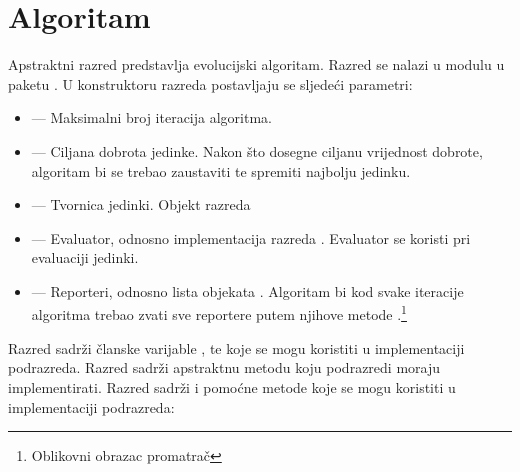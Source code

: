 \documentclass[times, utf8, zavrsni, numeric]{fer}
\begin{document}
\section{Algoritam}\label{algorithm}
Apstraktni razred  predstavlja evolucijski algoritam. Razred
se nalazi u modulu  u paketu . U
konstruktoru razreda  postavljaju se sljedeći parametri:
\begin{itemize}
    \item {} --- Maksimalni broj iteracija algoritma.
    \item {} --- Ciljana dobrota  jedinke.
        Nakon što dosegne ciljanu vrijednost dobrote, algoritam bi se trebao
        zaustaviti te spremiti najbolju jedinku.
    \item {} --- Tvornica jedinki. Objekt razreda
    \item {} --- Evaluator, odnosno implementacija razreda
        . Evaluator se koristi pri evaluaciji jedinki.
    \item {} --- Reporteri, odnosno lista objekata
        . Algoritam bi kod svake iteracije algoritma trebao
        zvati sve reportere putem njihove metode
        .\footnote{Oblikovni obrazac promatrač}
\end{itemize}
Razred sadrži članske varijable , 
te  koje se mogu koristiti u implementaciji podrazreda.
Razred sadrži apstraktnu metodu  koju podrazredi moraju
implementirati.
Razred  sadrži i pomoćne metode koje se mogu koristiti u
implementaciji podrazreda:
\end{document}
